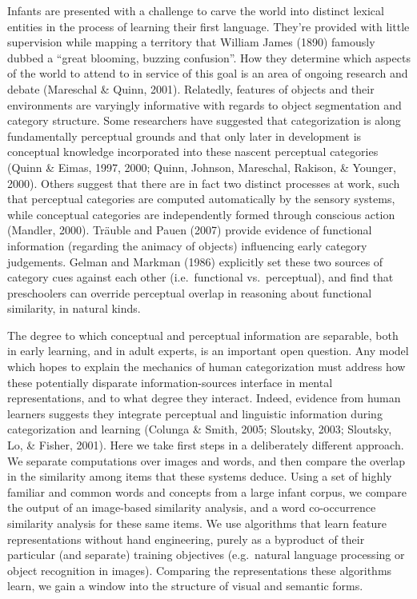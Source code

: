 \documentclass[10pt, letterpaper]{article}
\begin{document}
Infants are presented with a challenge to carve the world into distinct
lexical entities in the process of learning their first language.
They're provided with little supervision while mapping a territory that
William James (1890) famously dubbed a ``great blooming, buzzing
confusion''. How they determine which aspects of the world to attend to
in service of this goal is an area of ongoing research and debate
(Mareschal \& Quinn, 2001). Relatedly, features of objects and their
environments are varyingly informative with regards to object
segmentation and category structure. Some researchers have suggested
that categorization is along fundamentally perceptual grounds and that
only later in development is conceptual knowledge incorporated into
these nascent perceptual categories (Quinn \& Eimas, 1997, 2000; Quinn,
Johnson, Mareschal, Rakison, \& Younger, 2000). Others suggest that
there are in fact two distinct processes at work, such that perceptual
categories are computed automatically by the sensory systems, while
conceptual categories are independently formed through conscious action
(Mandler, 2000). Träuble and Pauen (2007) provide evidence of functional
information (regarding the animacy of objects) influencing early
category judgements. Gelman and Markman (1986) explicitly set these two
sources of category cues against each other (i.e.~functional
vs.~perceptual), and find that preschoolers can override perceptual
overlap in reasoning about functional similarity, in natural kinds.

The degree to which conceptual and perceptual information are separable,
both in early learning, and in adult experts, is an important open
question. Any model which hopes to explain the mechanics of human
categorization must address how these potentially disparate
information-sources interface in mental representations, and to what
degree they interact. Indeed, evidence from human learners suggests they
integrate perceptual and linguistic information during categorization
and learning (Colunga \& Smith, 2005; Sloutsky, 2003; Sloutsky, Lo, \&
Fisher, 2001). Here we take first steps in a deliberately different
approach. We separate computations over images and words, and then
compare the overlap in the similarity among items that these systems
deduce. Using a set of highly familiar and common words and concepts
from a large infant corpus, we compare the output of an image-based
similarity analysis, and a word co-occurrence similarity analysis for
these same items. We use algorithms that learn feature representations
without hand engineering, purely as a byproduct of their particular (and
separate) training objectives (e.g.~natural language processing or
object recognition in images). Comparing the representations these
algorithms learn, we gain a window into the structure of visual and
semantic forms.
\end{document}
